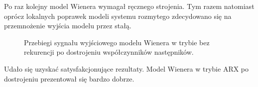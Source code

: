 Po raz kolejny model Wienera wymagał ręcznego strojenia. Tym razem natomiast oprócz lokalnych poprawek modeli systemu rozmytego zdecydowano się na przemnożenie wyjścia modelu przez stałą. 

\newpage

\begin{figure}[h!]
\centering
{}
\hfill
{}
\caption{Przebiegi sygnału wyjściowego modelu Wienera w trybie bez rekurencji po dostrojeniu współczynników następników.}
\end{figure}

Udało się uzyskać satysfakcjonujące rezultaty. Model Wienera w trybie ARX po dostrojeniu prezentował się bardzo dobrze.

\newpage

